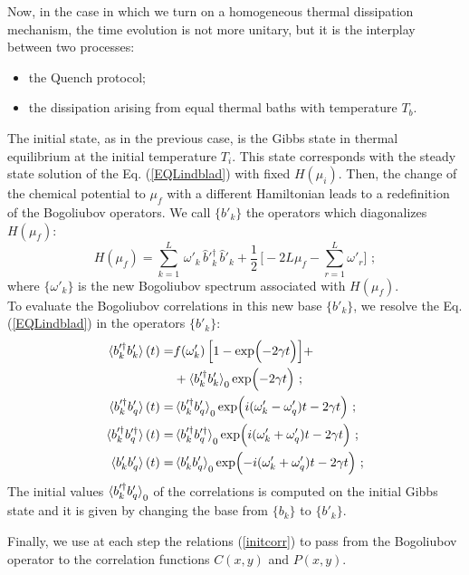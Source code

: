 \documentclass[pra,twocolumn,preprintnumbers,amsmath,amssymb,nofootinbib,floatfix,longbibliography]{revtex4}
\begin{document}
Now, in the case in which we turn on a homogeneous thermal
dissipation mechanism, the time evolution is not more
unitary, but it is the interplay between two processes:
\begin{itemize}
  \item the Quench protocol;
  \item the dissipation arising from equal thermal baths
  with temperature $T_b$.
\end{itemize}
The initial state, as in the previous case, is the Gibbs
state in thermal equilibrium at the initial temperature
$T_i$. This state corresponds with the steady state
solution of the Eq. (\ref{EQLindblad}) with fixed
$H(\mu_i)$. Then, the change of the chemical potential to
$\mu_f$ with a different Hamiltonian leads to a
redefinition of the Bogoliubov operators. We call
$\{b'_k\}$ the operators which diagonalizes $H(\mu_f)$:
\begin{equation}
  \label{quenchHdiag}
  H(\mu_f)=\sum _{k=1}^L\,\omega'_k \,\hat b'^\dagger _k\,
  \hat b'_k+ \frac{1}{2}\,\Bigr[ -2L\mu_f - \sum _{r=1}^L
  \omega'_r \Bigr] \,\,;
\end{equation}
where $\{\omega'_k\}$ is the new Bogoliubov spectrum
associated with $H(\mu_f)$.\\
To evaluate the Bogoliubov correlations in this new base
$\{b'_k\}$, we resolve the Eq. (\ref{EQLindblad}) in the
operators $\{b'_k\}$:
\begin{align}
  \label{EQLindbladprime}
  \braket{b'^\dagger_k b'_k}(t) =& f(\omega'_k) \,
  \Bigr[ 1 - \exp\Bigl( -2 \gamma t \Bigl) \Bigr]+ \notag\\
    & + \braket{b'^\dagger_k b'_k}_0
    \exp\Bigl( -2 \gamma t \Bigl) \,\,;\\
  \braket{b'^\dagger_k b'_q}(t) =&
  \braket{b'^\dagger_k b'_q}_0
  \exp\Bigl( i(\omega'_k - \omega'_q)t-2 \gamma t \Bigl)
  \,\,;\\
  \braket{b'^\dagger_k b'^\dagger_q}(t) =&
  \braket{b'^\dagger_k b'^\dagger_q}_0
  \exp\Bigl( i(\omega'_k + \omega'_q)t-2 \gamma t \Bigl)
  \,\,;\\
  \braket{b'_k b'_q}(t) =&
  \braket{b'_k b'_q}_0
  \exp\Bigl( -i(\omega'_k + \omega'_q)t-2 \gamma t \Bigl)
  \,\,;\\
\end{align}
The initial values $\braket{b'^\dagger_k b'_q}_0$ of the
correlations is computed on the initial Gibbs state and
it is given by changing the base from
$\{b_k \}$ to $\{b'_k\}$.

Finally, we use at each step the relations
(\ref{initcorr}) to pass from the Bogoliubov operator to
the correlation functions $C(x,y)$ and $P(x,y)$.
\end{document}
